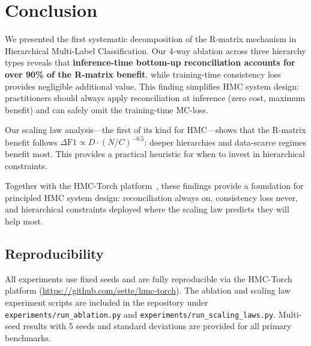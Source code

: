\section{Conclusion}
\label{sec:conclusion}

We presented the first systematic decomposition of the R-matrix
mechanism in Hierarchical Multi-Label Classification. Our 4-way ablation
across three hierarchy types reveals that \textbf{inference-time
bottom-up reconciliation accounts for over 90\% of the R-matrix
benefit}, while training-time consistency loss provides negligible
additional value. This finding simplifies HMC system design:
practitioners should always apply reconciliation at inference (zero
cost, maximum benefit) and can safely omit the training-time MC-loss.

Our scaling law analysis---the first of its kind for HMC---shows that
the R-matrix benefit follows $\Delta\text{F1} \propto D \cdot
(N/C)^{-0.5}$: deeper hierarchies and data-scarce regimes benefit most.
This provides a practical heuristic for when to invest in hierarchical
constraints.

Together with the HMC-Torch platform~\cite{sette2026hmctorch}, these
findings provide a foundation for principled HMC system design:
reconciliation always on, consistency loss never, and hierarchical
constraints deployed where the scaling law predicts they will help most.

\subsection*{Reproducibility}

All experiments use fixed seeds and are fully reproducible via the
HMC-Torch platform (\url{https://github.com/sette/hmc-torch}). The
ablation and scaling law experiment scripts are included in the
repository under \texttt{experiments/run\_ablation.py} and
\texttt{experiments/run\_scaling\_laws.py}. Multi-seed results with 5
seeds and standard deviations are provided for all primary benchmarks.

